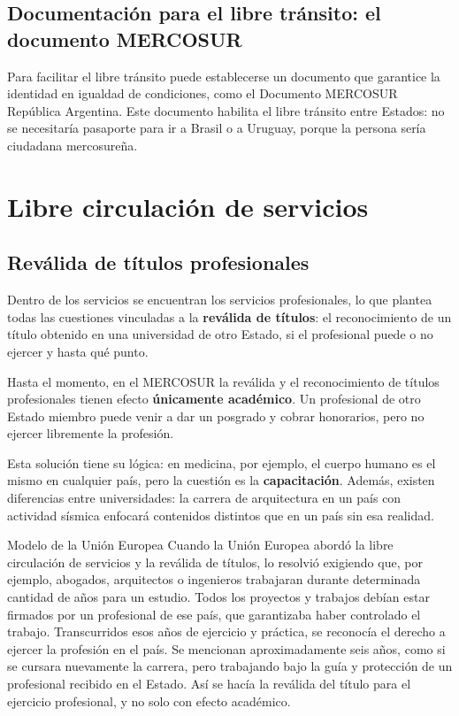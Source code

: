 \documentclass[12pt,oneside]{book}
\begin{document}
\subsection{Documentación para el libre tránsito: el documento MERCOSUR}

Para facilitar el libre tránsito puede establecerse un documento que garantice la identidad en igualdad de condiciones, como el Documento MERCOSUR República Argentina. Este documento habilita el libre tránsito entre Estados: no se necesitaría pasaporte para ir a Brasil o a Uruguay, porque la persona sería ciudadana mercosureña.

\section{Libre circulación de servicios}

\subsection{Reválida de títulos profesionales}

Dentro de los servicios se encuentran los servicios profesionales, lo que plantea todas las cuestiones vinculadas a la \textbf{reválida de títulos}: el reconocimiento de un título obtenido en una universidad de otro Estado, si el profesional puede o no ejercer y hasta qué punto.

\begin{important}
Hasta el momento, en el MERCOSUR la reválida y el reconocimiento de títulos profesionales tienen efecto \textbf{únicamente académico}. Un profesional de otro Estado miembro puede venir a dar un posgrado y cobrar honorarios, pero no ejercer libremente la profesión.
\end{important}

Esta solución tiene su lógica: en medicina, por ejemplo, el cuerpo humano es el mismo en cualquier país, pero la cuestión es la \textbf{capacitación}. Además, existen diferencias entre universidades: la carrera de arquitectura en un país con actividad sísmica enfocará contenidos distintos que en un país sin esa realidad.

\begin{example}{Modelo de la Unión Europea}
Cuando la Unión Europea abordó la libre circulación de servicios y la reválida de títulos, lo resolvió exigiendo que, por ejemplo, abogados, arquitectos o ingenieros trabajaran durante determinada cantidad de años para un estudio. Todos los proyectos y trabajos debían estar firmados por un profesional de ese país, que garantizaba haber controlado el trabajo. Transcurridos esos años de ejercicio y práctica, se reconocía el derecho a ejercer la profesión en el país. Se mencionan aproximadamente seis años, como si se cursara nuevamente la carrera, pero trabajando bajo la guía y protección de un profesional recibido en el Estado. Así se hacía la reválida del título para el ejercicio profesional, y no solo con efecto académico.
\end{example}
\end{document}
